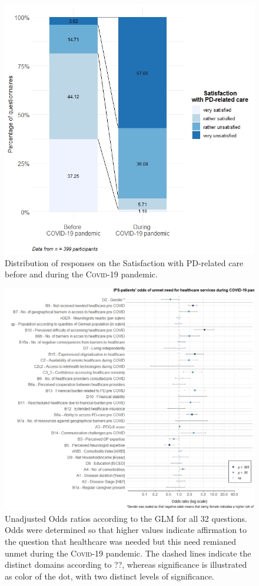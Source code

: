 \documentclass{bmcart}
\begin{document}
\begin{figure}
\centering
\includegraphics[width=.90\textwidth]{fig2.satisfaction.care.v1.0.jpeg}
\caption{Distribution of responses on the Satisfaction with PD-related care before and during the \textsc{Covid}-19 pandemic.}
\label{fig2:satisfaction}
\end{figure}

\begin{figure}
\centering
\includegraphics[width=.90\textwidth]{fig3.oddsratios.v1.0.jpeg}
\caption{Unadjusted Odds ratios according to the \textsc{GLM} for all 32 questions. Odds were determined so that higher values indicate affirmation to the question that healthcare was needed but this need remianed unmet during the \textsc{Covid}-19 pandemic. The dashed lines indicate the distinct domains according to ??, whereas significance is illustrated as color of the dot, with two distinct levels of significance. }%
\label{fig3:resultsOR1}
\end{figure}
\end{document}
